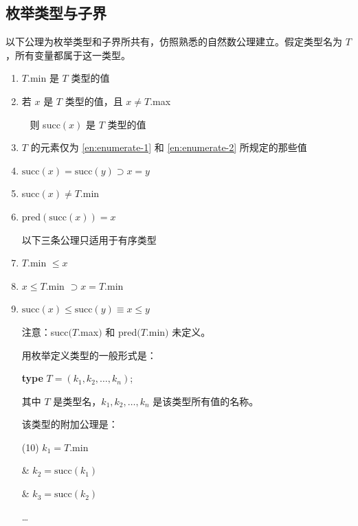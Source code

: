 \documentclass[twoside,11pt,fontset=none]{ctexbook}
\begin{document}
\subsection{枚举类型与子界}

以下公理为枚举类型和子界所共有，仿照熟悉的自然数公理建立。假定类型名为 $T$，所有变量都属于这一类型。

\begin{enumerate}[wide, nosep, label=(\arabic*)]
	\item \label{en:enumerate-1}
	$T$.min 是 $T$ 类型的值
	
	\item \label{en:enumerate-2}
	若 $x$ 是 $T$ 类型的值，且 $x\neq T$.max

	\qquad~ 则 succ$(x)$ 是 $T$ 类型的值

	\item $T$ 的元素仅为 \ref{en:enumerate-1} 和 \ref{en:enumerate-2} 所规定的那些值

	\item $\text{succ}(x) = \text{succ}(y) \supset x = y$

	\item succ$(x) \neq T$.min

	\item $\text{pred}(\text{succ}(x)) = x$

	\noindent
	以下三条公理只适用于有序类型

	\setcounter{enumi}{6}
	\item $T$.min $\leqslant x$

	\item $x \leqslant T$.min $\supset x = T$.min

	\item \label{en:enumerate-9}
	$\text{succ}(x) \leqslant \text{succ}(y) \equiv x \leqslant y$

	\noindent
	注意：succ$(T$.max$)$ 和 pred$(T$.min$)$ 未定义。

	用枚举定义类型的一般形式是：

	\quad \textbf{type} $T = (k_1, k_2, \dots, k_n)$;

	\noindent
	其中 $T$ 是类型名，$k_1, k_2 , \dots, k_n$ 是该类型所有值的名称。
	
	该类型的附加公理是：
	
	\tabto*{.9em}(10) $k_1 = T$.min
	
	\tabto*{1.8em}\& $k_2 = \text{succ}(k_1)$
	
	\tabto*{1.8em}\& $k_3 = \text{succ}(k_2)$
	
	\tabto*{3.8em}\dots
	

\end{enumerate}
\end{document}
